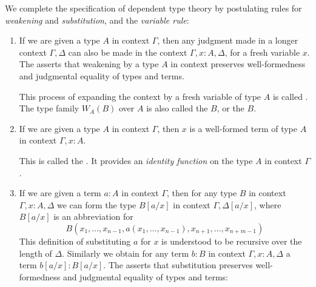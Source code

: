 We complete the specification of dependent type theory by postulating rules for \emph{weakening} and \emph{substitution}, and the \emph{variable rule}:
\begin{enumerate}
\item If we are given a type $A$ in context $\Gamma$, then any judgment made in a longer context $\Gamma,\Delta$ can also be made in the context $\Gamma,x:A,\Delta$, for a fresh variable $x$. The  asserts that weakening by a type $A$ in context preserves well-formedness and judgmental equality of types and terms.
\begin{prooftree}
\end{prooftree}
This process of expanding the context by a fresh variable of type $A$ is called . The type family $W_A(B)$ over $A$ is also called the  $B$, or the  $B$.
\item If we are given a type $A$ in context $\Gamma$, then $x$ is a well-formed term of type $A$ in context $\Gamma,x:A$.
\begin{prooftree}
\end{prooftree}
This is called the . It provides an \emph{identity function} on the type $A$ in context $\Gamma$.
\item If we are given a term $a:A$ in context $\Gamma$, then for any type $B$ in context $\Gamma,x:A,\Delta$ we can form the type $B[a/x]$ in context $\Gamma,\Delta[a/x]$, where $B[a/x]$ is an abbreviation for
\begin{equation*}
B(x_1,\ldots,x_{n-1},a(x_1,\ldots,x_{n-1}),x_{n+1},\ldots,x_{n+m-1})
\end{equation*}
This definition of substituting $a$ for $x$ is understood to be recursive over the length of $\Delta$. Similarly we obtain for any term $b:B$ in context $\Gamma,x:A,\Delta$ a term $b[a/x]:B[a/x]$. The  asserts that substitution preserves well-formedness and judgmental equality of types and terms:

\end{enumerate}

